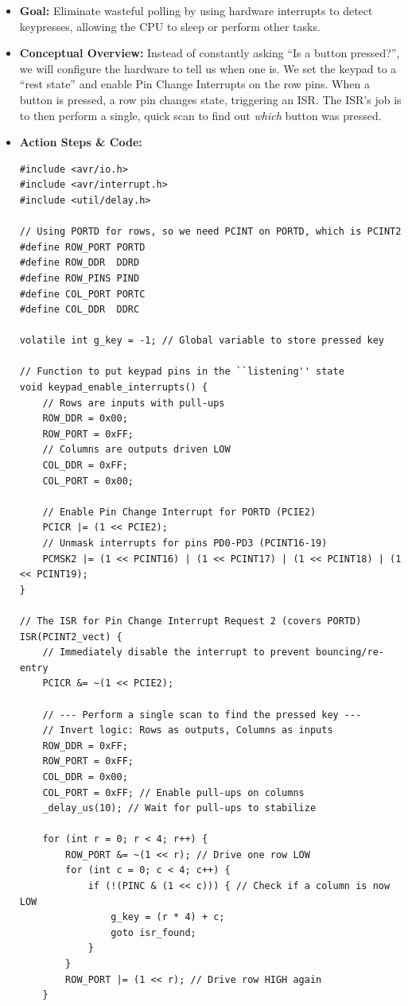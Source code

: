 \documentclass[11pt,a4paper]{article}
\begin{document}
\begin{itemize}
    \item \textbf{Goal:} Eliminate wasteful polling by using hardware interrupts to detect keypresses, allowing the CPU to sleep or perform other tasks.
    \item \textbf{Conceptual Overview:} Instead of constantly asking ``Is a button pressed?'', we will configure the hardware to tell us when one is. We set the keypad to a ``rest state'' and enable Pin Change Interrupts on the row pins. When a button is pressed, a row pin changes state, triggering an ISR. The ISR's job is to then perform a single, quick scan to find out \emph{which} button was pressed.
    \item \textbf{Action Steps \& Code:}
\begin{lstlisting}[caption={Code for Module 6.3: Interrupt-Driven Keypad}]
#include <avr/io.h>
#include <avr/interrupt.h>
#include <util/delay.h>

// Using PORTD for rows, so we need PCINT on PORTD, which is PCINT2
#define ROW_PORT PORTD
#define ROW_DDR  DDRD
#define ROW_PINS PIND
#define COL_PORT PORTC
#define COL_DDR  DDRC

volatile int g_key = -1; // Global variable to store pressed key

// Function to put keypad pins in the ``listening'' state
void keypad_enable_interrupts() {
    // Rows are inputs with pull-ups
    ROW_DDR = 0x00;
    ROW_PORT = 0xFF;
    // Columns are outputs driven LOW
    COL_DDR = 0xFF;
    COL_PORT = 0x00;
    
    // Enable Pin Change Interrupt for PORTD (PCIE2)
    PCICR |= (1 << PCIE2);
    // Unmask interrupts for pins PD0-PD3 (PCINT16-19)
    PCMSK2 |= (1 << PCINT16) | (1 << PCINT17) | (1 << PCINT18) | (1 << PCINT19);
}

// The ISR for Pin Change Interrupt Request 2 (covers PORTD)
ISR(PCINT2_vect) {
    // Immediately disable the interrupt to prevent bouncing/re-entry
    PCICR &= ~(1 << PCIE2);

    // --- Perform a single scan to find the pressed key ---
    // Invert logic: Rows as outputs, Columns as inputs
    ROW_DDR = 0xFF;
    ROW_PORT = 0xFF;
    COL_DDR = 0x00;
    COL_PORT = 0xFF; // Enable pull-ups on columns
    _delay_us(10); // Wait for pull-ups to stabilize

    for (int r = 0; r < 4; r++) {
        ROW_PORT &= ~(1 << r); // Drive one row LOW
        for (int c = 0; c < 4; c++) {
            if (!(PINC & (1 << c))) { // Check if a column is now LOW
                g_key = (r * 4) + c;
                goto isr_found;
            }
        }
        ROW_PORT |= (1 << r); // Drive row HIGH again
    }


\end{lstlisting}
\end{itemize}
\end{document}
